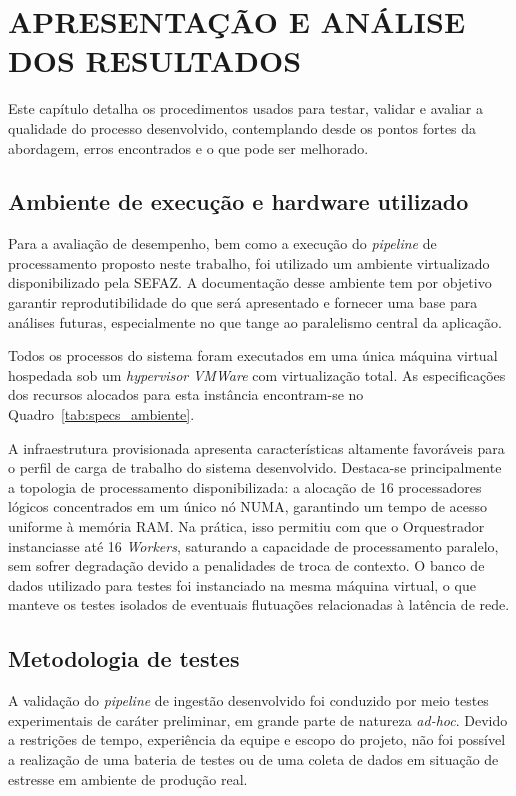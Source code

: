 \section{APRESENTAÇÃO E ANÁLISE DOS RESULTADOS}
\label{sec:apresentacao_analise_resultados}
Este capítulo detalha os procedimentos usados para testar, validar e avaliar a
qualidade do processo desenvolvido, contemplando desde os pontos fortes da
abordagem, erros encontrados e o que pode ser melhorado.

\subsection{Ambiente de execução e hardware utilizado}
\label{sec:ambiente_execucao}
Para a avaliação de desempenho, bem como a execução do \textit{pipeline} de
processamento proposto neste trabalho, foi utilizado um ambiente virtualizado
disponibilizado pela SEFAZ. A documentação desse ambiente tem por objetivo
garantir reprodutibilidade do que será apresentado e fornecer uma base para
análises futuras, especialmente no que tange ao paralelismo central da
aplicação.

Todos os processos do sistema foram executados em uma única máquina virtual
hospedada sob um \textit{hypervisor} \textit{VMWare} com virtualização total.
As especificações dos recursos alocados para esta instância encontram-se no
Quadro~\ref{tab:specs_ambiente}.



A infraestrutura provisionada apresenta características altamente favoráveis
para o perfil de carga de trabalho do sistema desenvolvido. Destaca-se
principalmente a topologia de processamento disponibilizada: a alocação de 16
processadores lógicos concentrados em um único nó NUMA, garantindo um tempo de
acesso uniforme à memória RAM. Na prática, isso permitiu com que o Orquestrador
instanciasse até 16 \textit{Workers}, saturando a capacidade
de processamento paralelo, sem sofrer degradação devido a penalidades de
troca de contexto. O banco de dados utilizado para testes foi instanciado
na mesma máquina virtual, o que manteve os testes isolados de
eventuais flutuações relacionadas à latência de rede. 

\subsection{Metodologia de testes}
\label{sec:testes}
A validação do \textit{pipeline} de ingestão desenvolvido foi conduzido por
meio testes experimentais de caráter preliminar, em grande parte de natureza
\textit{ad-hoc}. Devido a restrições de tempo, experiência da equipe e escopo
do projeto, não foi possível a realização de uma bateria de testes ou de uma
coleta de dados em situação de estresse em ambiente de produção real.

